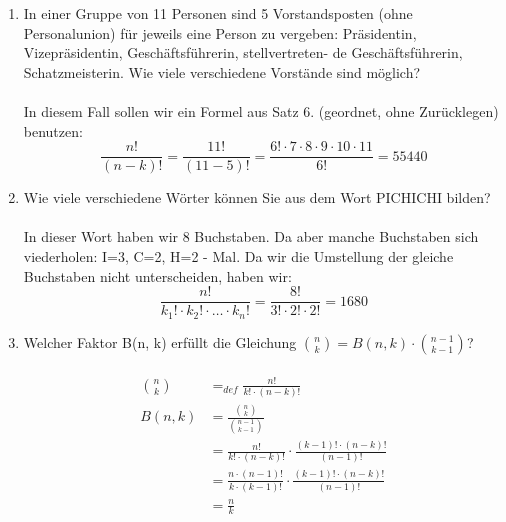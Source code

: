 \begin{enumerate}[label=(\alph*)]
        \item In einer Gruppe von 11 Personen sind 5 Vorstandsposten (ohne Personalunion) für jeweils
        eine Person zu vergeben: Präsidentin, Vizepräsidentin, Geschäftsführerin, stellvertreten-
        de Geschäftsführerin, Schatzmeisterin. Wie viele verschiedene Vorstände sind möglich?\\\\
        In diesem Fall sollen wir ein Formel aus Satz 6. (geordnet, ohne Zur\"ucklegen) benutzen:
        \[\frac{n!}{(n-k)!}=\frac{11!}{(11-5)!}
        =\frac{6!\cdot7\cdot8\cdot9\cdot10\cdot11}{6!}
        =55440\]

        \item Wie viele verschiedene Wörter können Sie aus dem Wort PICHICHI bilden?\\\\
        In dieser Wort haben wir 8 Buchstaben. Da aber manche Buchstaben sich viederholen: 
        I=3, C=2, H=2 - Mal. Da wir die Umstellung der gleiche Buchstaben nicht unterscheiden, haben wir:
        \[\frac{n!}{k_1!\cdot k_2!\cdot\ldots\cdot k_n!} = \frac{8!}{3!\cdot2!\cdot2!} = 1680\]

        \item Welcher Faktor B(n, k) erfüllt die Gleichung $\binom{n}{k} = B(n,k)\cdot\binom{n-1}{k-1}$?\\\\
        \begin{align*}
        \binom{n}{k} &=_{def} \frac{n!}{k!\cdot(n-k)!}\\
        B(n,k) &= \frac{\binom{n}{k}}{\binom{n-1}{k-1}}\\
        &= \frac{n!}{k!\cdot(n-k)!} \cdot \frac{(k-1)!\cdot(n-k)!}{(n-1)!}\\
        &= \frac{n\cdot(n-1)!}{k\cdot(k-1)!} \cdot \frac{(k-1)!\cdot(n-k)!}{(n-1)!}\\
        &= \frac{n}{k}
        \end{align*}
    \end{enumerate}
